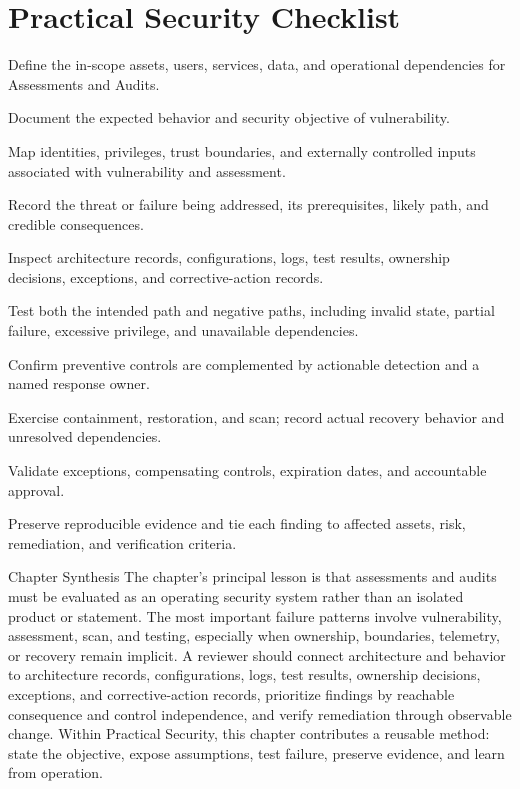 \documentclass[11pt,letterpaper]{article}
\begin{document}
\section*{Practical Security Checklist}
\begin{CornellChecklist}
\item Define the in-scope assets, users, services, data, and operational dependencies for Assessments and Audits.
\item Document the expected behavior and security objective of vulnerability.
\item Map identities, privileges, trust boundaries, and externally controlled inputs associated with vulnerability and assessment.
\item Record the threat or failure being addressed, its prerequisites, likely path, and credible consequences.
\item Inspect architecture records, configurations, logs, test results, ownership decisions, exceptions, and corrective-action records.
\item Test both the intended path and negative paths, including invalid state, partial failure, excessive privilege, and unavailable dependencies.
\item Confirm preventive controls are complemented by actionable detection and a named response owner.
\item Exercise containment, restoration, and scan; record actual recovery behavior and unresolved dependencies.
\item Validate exceptions, compensating controls, expiration dates, and accountable approval.
\item Preserve reproducible evidence and tie each finding to affected assets, risk, remediation, and verification criteria.
\end{CornellChecklist}
\begin{CornellSummaryBox}{Chapter Synthesis}
The chapter's principal lesson is that assessments and audits must be evaluated as an operating security system rather than an isolated product or statement. The most important failure patterns involve vulnerability, assessment, scan, and testing, especially when ownership, boundaries, telemetry, or recovery remain implicit. A reviewer should connect architecture and behavior to architecture records, configurations, logs, test results, ownership decisions, exceptions, and corrective-action records, prioritize findings by reachable consequence and control independence, and verify remediation through observable change. Within Practical Security, this chapter contributes a reusable method: state the objective, expose assumptions, test failure, preserve evidence, and learn from operation.
\end{CornellSummaryBox}
\end{document}
